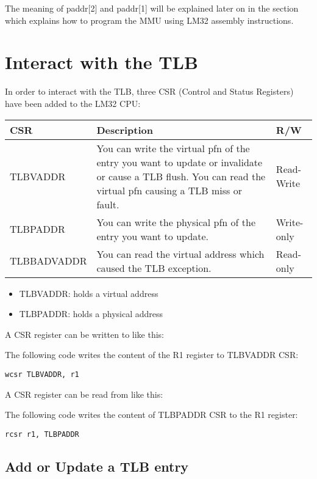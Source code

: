 \documentclass[a4paper,11pt]{article}
\begin{document}
The meaning of paddr[2] and paddr[1] will be explained later on in the section which explains how to program the MMU using LM32 assembly instructions.

\section{Interact with the TLB}

In order to interact with the TLB, three CSR (Control and Status Registers) have been added to the LM32 CPU:

\begin{tabular}{l p{} l}
\bf{CSR} & \bf{Description} & \bf{R/W} \\
\hline
TLBVADDR & You can write the virtual pfn of the entry you want to update or invalidate or cause a TLB flush.
\newline
	   You can read the virtual pfn causing a TLB miss or fault.
& Read-Write \\
TLBPADDR & You can write the physical pfn of the entry you want to update. & Write-only \\
TLBBADVADDR & You can read the virtual address which caused the TLB exception. & Read-only \\
\hline
\end{tabular}

\begin{itemize}
	\item TLBVADDR: holds a virtual address
	\item TLBPADDR: holds a physical address
\end{itemize}

A CSR register can be written to like this:

The following code writes the content of the R1 register to TLBVADDR CSR:
\begin{lstlisting}
wcsr TLBVADDR, r1
\end{lstlisting}

A CSR register can be read from like this:

The following code writes the content of TLBPADDR CSR to the R1 register:
\begin{lstlisting}
rcsr r1, TLBPADDR
\end{lstlisting}

\subsection{Add or Update a TLB entry}
\end{document}
